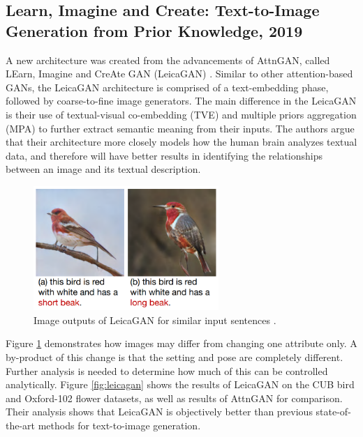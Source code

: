 \documentclass[letterpaper]{article} %
\begin{document}
\subsection{Learn, Imagine and Create: Text-to-Image Generation from Prior 
Knowledge, 2019}
A new architecture was created from the advancements of AttnGAN, called LEarn, 
Imagine and CreAte GAN (LeicaGAN) \cite{leica}. Similar to other 
attention-based GANs, the LeicaGAN architecture is comprised of a 
text-embedding phase, followed by coarse-to-fine image generators. The main 
difference in the LeicaGAN is their use of textual-visual co-embedding (TVE) 
and multiple priors aggregation (MPA) to further extract semantic meaning from 
their inputs. The authors argue that their architecture more closely models how 
the human brain analyzes textual data, and therefore will have better results 
in identifying the relationships between an image and its textual description.

\begin{figure}[htbp]
	\centerline{\includegraphics[width=7cm]{leicagan_sample.png}}
	\caption{Image outputs of LeicaGAN for similar input sentences
		\cite{leica}.}
	\label{fig:leica_sample}
\end{figure}

Figure \ref{fig:leica_sample} demonstrates how images may differ from changing 
one attribute only. A by-product of this change is that the setting and pose 
are completely different. Further analysis is needed to determine how much of 
this can be controlled analytically. Figure \ref{fig:leicagan} shows the 
results of LeicaGAN on the CUB bird and Oxford-102 flower datasets, as well as 
results of AttnGAN for comparison. Their analysis shows that LeicaGAN is 
objectively better than previous state-of-the-art methods for text-to-image 
generation.
\end{document}
